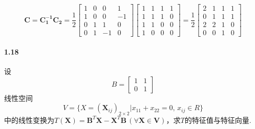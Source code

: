 \documentclass[12pt, a4paper, oneside, fontset=none]{ctexart}
\begin{document}
\[
    \bm{C} = \bm{C_1^{-1}C_2} = \dfrac{1}{2} \begin{bmatrix}
        1 & 0 & 0  & 1  \\
        1 & 0 & 0  & -1 \\
        0 & 1 & 1  & 0  \\
        0 & 1 & -1 & 0
    \end{bmatrix} \begin{bmatrix}
        1 & 1 & 1 & 1 \\
        1 & 1 & 1 & 0 \\
        1 & 1 & 0 & 0 \\
        1 & 0 & 0 & 0
    \end{bmatrix} = \dfrac{1}{2} \begin{bmatrix}
        2 & 1 & 1 & 1 \\
        0 & 1 & 1 & 1 \\
        2 & 2 & 1 & 0 \\
        0 & 0 & 1 & 0
    \end{bmatrix}
\]

\paragraph*{1.18} 设
\[
    B = \begin{bmatrix}
        1 & 1 \\
        0 & 1
    \end{bmatrix}
\]
线性空间
\[
    V = \{X = (\bm{X}_{ij})_{2\times 2} | x_{11} + x_{22} = 0, \, x_{ij} \in R\}
\]
中的线性变换为$T(\bm{X}) = \bm{B}^T\bm{X} - \bm{X}^T\bm{B}\, (\forall \bm{X} \in \bm{V})$，求$T$的特征值与特征向量.
\end{document}
